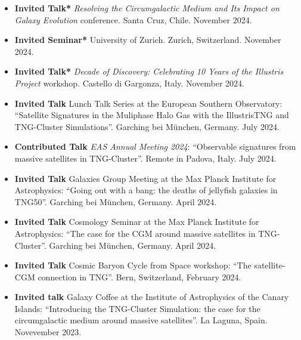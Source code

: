 \documentclass[a4paper,10pt,oneside]{article}
\begin{document}
\begin{itemize}[wide, labelwidth=!, labelindent=-11pt, parsep=0pt]
    \item {\bf Invited Talk*}  {\it Resolving the Circumgalactic Medium and Its Impact on Galaxy Evolution} conference. Santa Cruz, Chile. November 2024.
    \item {\bf Invited Seminar*}  University of Zurich. Zurich, Switzerland. November 2024.
    \item {\bf Invited Talk*}  {\it Decade of Discovery: Celebrating 10 Years of the Illustris Project} workshop. Castello di Gargonza, Italy. November 2024.
    \item {\bf Invited Talk} Lunch Talk Series at the European Southern Observatory: ``Satellite Signatures in the Muliphase Halo Gas with the IllustrisTNG and TNG-Cluster Simulations''. Garching bei M{\"u}nchen, Germany. July 2024.
    \item {\bf Contributed Talk} {\it EAS Annual Meeting 2024}: ``Observable signatures from massive satellites in TNG-Cluster''. Remote in Padova, Italy. July 2024.
    \item {\bf Invited Talk} Galaxies Group Meeting at the Max Planck Institute for Astrophysics: ``Going out with a bang: the deaths of jellyfish galaxies in TNG50''. Garching bei M{\"u}nchen, Germany. April 2024.
    \item {\bf Invited Talk} Cosmology Seminar at the Max Planck Institute for Astrophysics: ``The case for the CGM around massive satellites in TNG-Cluster''. Garching bei M{\"u}nchen, Germany. April 2024.
    \item {\bf Invited Talk} Cosmic Baryon Cycle from Space workshop: ``The satellite-CGM connection in TNG''. Bern, Switzerland, February 2024.
    \item {\bf Invited talk} Galaxy Coffee at the Institute of Astrophysics of the Canary Islands: ``Introducing the TNG-Cluster Simulation: the case for the circumgalactic medium around massive satellites''. La Laguna, Spain. Novevember 2023.

\end{itemize}
\end{document}
